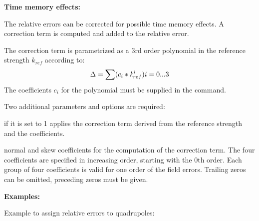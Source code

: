 {\bf Time memory effects:}

The relative errors can be corrected for possible time memory effects. A
correction term is computed and added to the relative error. 

The correction term is parametrized as a 3rd order polynomial in the
reference strength $k_{ref}$ according to:  
\[ \Delta = \sum (c_i * {\it k}^{i}_{ref})            i = 0...3\]
The coefficients $c_i$ for the polynomial must be supplied in the
command.  

Two additional parameters and options are required: 
\begin{madlist}
   if it is set to 1 applies the correction term derived from the
  reference strength and the coefficients.  

   normal and skew coefficients for the computation
  of the correction term. The four coefficients are specified in increasing
  order, starting with the 0th order. Each group of four coefficients is
  valid for one order of the field errors. Trailing zeros can be omitted,
  preceding zeros must be given.  
\end{madlist}

{\bf Examples:}

Example to assign relative errors to quadrupoles: 


